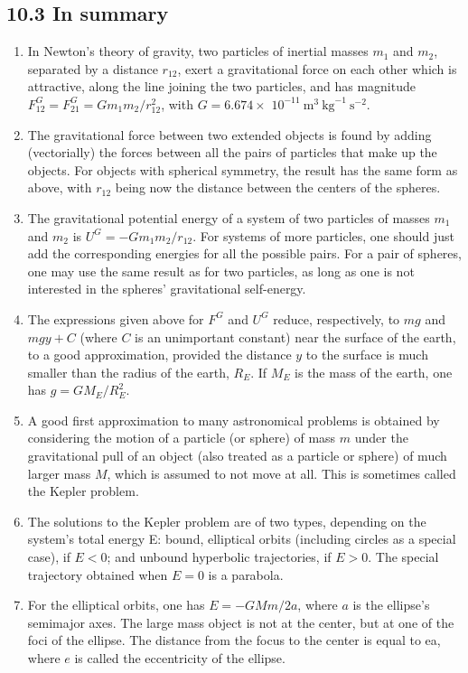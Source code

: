 \documentclass[10pt]{article}
\begin{document}
\subsection*{10.3 In summary}
\begin{enumerate}
  \item In Newton's theory of gravity, two particles of inertial masses $m_{1}$ and $m_{2}$, separated by a distance $r_{12}$, exert a gravitational force on each other which is attractive, along the line joining the two particles, and has magnitude $F_{12}^{G}=F_{21}^{G}=G m_{1} m_{2} / r_{12}^{2}$, with $G=6.674 \times$ $10^{-11} \mathrm{~m}^{3} \mathrm{~kg}^{-1} \mathrm{~s}^{-2}$.
  \item The gravitational force between two extended objects is found by adding (vectorially) the forces between all the pairs of particles that make up the objects. For objects with spherical symmetry, the result has the same form as above, with $r_{12}$ being now the distance between the centers of the spheres.
  \item The gravitational potential energy of a system of two particles of masses $m_{1}$ and $m_{2}$ is $U^{G}=-G m_{1} m_{2} / r_{12}$. For systems of more particles, one should just add the corresponding energies for all the possible pairs. For a pair of spheres, one may use the same result as for two particles, as long as one is not interested in the spheres' gravitational self-energy.
  \item The expressions given above for $F^{G}$ and $U^{G}$ reduce, respectively, to $m g$ and $m g y+C$ (where $C$ is an unimportant constant) near the surface of the earth, to a good approximation, provided the distance $y$ to the surface is much smaller than the radius of the earth, $R_{E}$. If $M_{E}$ is the mass of the earth, one has $g=G M_{E} / R_{E}^{2}$.
  \item A good first approximation to many astronomical problems is obtained by considering the motion of a particle (or sphere) of mass $m$ under the gravitational pull of an object (also treated as a particle or sphere) of much larger mass $M$, which is assumed to not move at all. This is sometimes called the Kepler problem.
  \item The solutions to the Kepler problem are of two types, depending on the system's total energy E: bound, elliptical orbits (including circles as a special case), if $E<0$; and unbound hyperbolic trajectories, if $E>0$. The special trajectory obtained when $E=0$ is a parabola.
  \item For the elliptical orbits, one has $E=-G M m / 2 a$, where $a$ is the ellipse's semimajor axes. The large mass object is not at the center, but at one of the foci of the ellipse. The distance from the focus to the center is equal to ea, where $e$ is called the eccentricity of the ellipse.

\end{enumerate}
\end{document}
